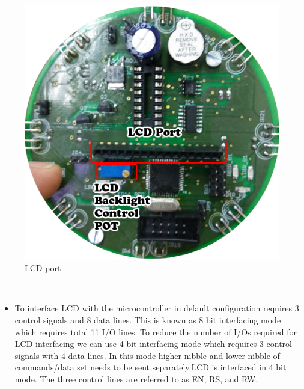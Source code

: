 \documentclass[a4paper,12pt,oneside]{book}
\begin{document}
	\hfill\\
	\begin{figure}[h!]
		\caption{LCD port}
		\includegraphics[width=\textwidth]{./HardwareManual/lcd1.jpg}
	\end{figure}	
	\hfill\\
	
	\begin{itemize}
	\item {
	To interface LCD with the microcontroller in default configuration requires 3 control signals and
	8 data lines. This is known as 8 bit interfacing mode which requires total 11 I/O lines. To reduce
	the number of I/Os required for LCD interfacing we can use 4 bit interfacing mode which
	requires 3 control signals with 4 data lines. In this mode higher nibble and lower nibble of
	commands/data set needs to be sent separately.LCD is interfaced in 4 bit
	mode. The three control lines are referred to as EN, RS, and RW.
	}
	\end{itemize}
\end{document}
